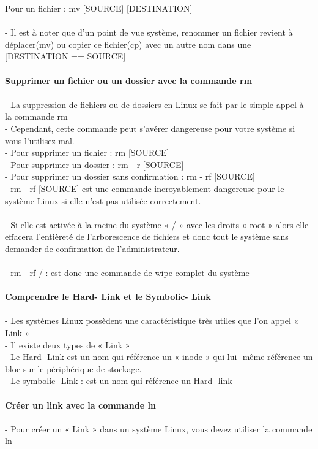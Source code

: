\documentclass[10pt,a4paper]{article}
\begin{document}
Pour un fichier : mv [SOURCE] [DESTINATION] \\\\
- Il est à noter que d’un point de vue système, renommer un fichier revient à déplacer(mv) ou copier ce fichier(cp) avec un autre nom dans une [DESTINATION == SOURCE]\\\\
{\large\textbf{Supprimer un fichier ou un dossier avec la commande rm}}\\\\
- La suppression de fichiers ou de dossiers en Linux se fait par le simple appel à la commande rm \\
- Cependant, cette commande peut s’avérer dangereuse pour votre système si vous l’utilisez mal. \\
- Pour supprimer un fichier : rm [SOURCE] \\
- Pour supprimer un dossier : rm - r [SOURCE] \\
- Pour supprimer un dossier sans confirmation : rm - rf [SOURCE] \\
- rm - rf [SOURCE] est une commande incroyablement dangereuse pour le système Linux si elle n’est pas utilisée correctement. \\\\
- Si elle est activée à la racine du système « / » avec les droits « root » alors elle effacera l’entièreté de l’arborescence de fichiers et donc tout le système sans demander de confirmation de l’administrateur. \\\\
- rm - rf / : est donc une commande de wipe complet du système\\\\
{\large\textbf{Comprendre le Hard- Link et le Symbolic- Link}}\\\\
- Les systèmes Linux possèdent une caractéristique très utiles que l’on appel « Link »\\
- Il existe deux types de « Link » \\
- Le Hard- Link est un nom qui référence un « inode » qui lui- même référence un bloc sur le périphérique de stockage.\\
- Le symbolic- Link : est un nom qui référence un Hard- link\\\\
{\large\textbf{Créer un link avec la commande ln }}\\\\
- Pour créer un « Link » dans un système Linux, vous devez utiliser la commande ln \\
\end{document}
